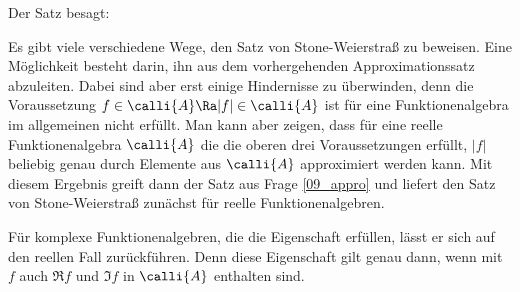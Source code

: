 \begin{antwort}
  Der Satz besagt: 

  \medskip\noindent
  Es gibt viele verschiedene Wege, den Satz von Stone-Weierstraß zu beweisen. 
  Eine Möglichkeit besteht darin, ihn aus dem vorhergehenden Approximationssatz 
  abzuleiten. Dabei sind aber erst einige Hindernisse zu überwinden, denn 
  die Voraussetzung $f\in \calli{A} \Ra | f | \in \calli{A}$ ist 
  für eine Funktionenalgebra im allgemeinen nicht erfüllt. Man kann aber 
  zeigen, dass für eine reelle Funktionenalgebra $\calli{A}$ die 
  die oberen drei Voraussetzungen erfüllt, $|f|$ beliebig genau durch 
  Elemente aus $\calli{A}$ approximiert werden kann. Mit diesem Ergebnis 
  greift dann der Satz aus Frage \ref{09_appro} und liefert den Satz 
  von Stone-Weierstraß zunächst für reelle Funktionenalgebren. 

  Für komplexe Funktionenalgebren, die die Eigenschaft  erfüllen, 
  lässt er sich auf den reellen Fall zurückführen. Denn diese Eigenschaft 
  gilt genau dann, wenn mit $f$ auch $\Re f$ und $\Im f$ in $\calli{A}$ 
  enthalten sind. 
  \AntEnd
\end{antwort}

